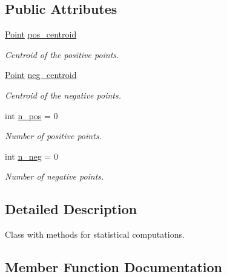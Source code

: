 \subsection*{Public Attributes}
\begin{DoxyCompactItemize}
\item 
\mbox{\label{class_statistics_a51adeaf4b7f078a4dfd373082fd1f7e1}} 
\hyperlink{class_point}{Point} \hyperlink{class_statistics_a51adeaf4b7f078a4dfd373082fd1f7e1}{pos\+\_\+centroid}
\begin{DoxyCompactList}\small\item\em Centroid of the positive points. \end{DoxyCompactList}\item 
\mbox{\label{class_statistics_ab7a104abc574d7d0e063f97ccc5f52e0}} 
\hyperlink{class_point}{Point} \hyperlink{class_statistics_ab7a104abc574d7d0e063f97ccc5f52e0}{neg\+\_\+centroid}
\begin{DoxyCompactList}\small\item\em Centroid of the negative points. \end{DoxyCompactList}\item 
\mbox{\label{class_statistics_a95918ee9568c41b665ba3920f3255829}} 
int \hyperlink{class_statistics_a95918ee9568c41b665ba3920f3255829}{n\+\_\+pos} = 0
\begin{DoxyCompactList}\small\item\em Number of positive points. \end{DoxyCompactList}\item 
\mbox{\label{class_statistics_a221eee7599d594bc55f69608c82bb242}} 
int \hyperlink{class_statistics_a221eee7599d594bc55f69608c82bb242}{n\+\_\+neg} = 0
\begin{DoxyCompactList}\small\item\em Number of negative points. \end{DoxyCompactList}\end{DoxyCompactItemize}


\subsection{Detailed Description}
Class with methods for statistical computations. 

\subsection{Member Function Documentation}
\mbox{\label{class_statistics_ad56432dac5366707268de10e58f7972a}} 
